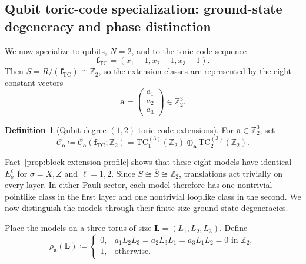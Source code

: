 \documentclass[aps,prx,english,superscriptaddress,twocolumn,tightenlines,showpacs,longbibliography,floatfix,amsfonts]{revtex4-2}
\theoremstyle{remark}
\theoremstyle{definition}
\newtheorem{definition}{Definition}
\begin{document}
\subsection{Qubit toric-code specialization: ground-state degeneracy and phase distinction}

We now specialize to qubits, \(N=2\), and to the toric-code sequence
\begin{equation}
	\mathbf f_{\mathrm{TC}}=(x_1-1,x_2-1,x_3-1).
\end{equation}
Then \(S=R/(\mathbf f_{\mathrm{TC}})\cong\mathbb Z_2\), so the extension
classes are represented by the eight constant vectors
\begin{equation}
	\mathbf a=\begin{pmatrix}a_1\\a_2\\a_3\end{pmatrix}
	\in\mathbb Z_2^3.
\end{equation}

\begin{definition}[Qubit degree-\((1,2)\) toric-code extensions]
	\label{def:degree-12-toric-extension}
	For \(\mathbf a\in\mathbb Z_2^3\), set
	\begin{equation}
		\mathcal C_{\mathbf a}
		\coloneqq
		\mathcal C_{\mathbf a}(\mathbf f_{\mathrm{TC}};\mathbb Z_2)
		=
		\mathrm{TC}_1^{(3)}(\mathbb Z_2)
		\mathbin{\oplus_{\mathbf a}}
		\mathrm{TC}_2^{(3)}(\mathbb Z_2).
		\label{eq:coupled-toric-family}
	\end{equation}
\end{definition}

Fact~\ref{prop:block-extension-profile} shows that these eight models have
identical \(E_\sigma^\ell\) for \(\sigma=X,Z\) and \(\ell=1,2\). Since
\(S\cong\overline S\cong\mathbb Z_2\), translations act trivially on every
layer. In either Pauli sector, each model therefore has one nontrivial
pointlike class in the first layer and one nontrivial looplike class in the
second.
We now distinguish the models through their finite-size ground-state
degeneracies.

Place the models on a three-torus of size
\(\mathbf L=(L_1,L_2,L_3)\).  Define
\begin{equation}
	\rho_{\mathbf a}(\mathbf L)
	\coloneqq
	\begin{cases}
		0, & a_1L_2L_3=a_2L_3L_1=a_3L_1L_2=0 \text{ in }\mathbb{Z}_2,\\
		1, & \text{otherwise}.
	\end{cases}
	\label{eq:rho-E}
\end{equation}
\end{document}

